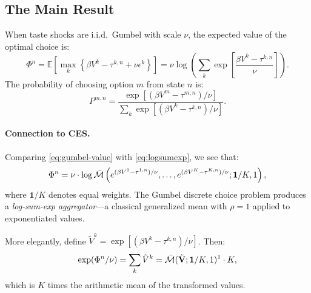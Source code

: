 \subsection{The Main Result}

\begin{theorem}
\label{thm:gumbel}
When taste shocks are i.i.d.\ Gumbel with scale $\nu$, the expected value of the optimal choice is:
\begin{equation}
\label{eq:gumbel-value}
\boxed{\Phi^n = \mathbb{E}\left[ \max_k \left\{ \beta V^k - \tau^{k,n} + \nu \epsilon^k \right\} \right] = \nu \log \left( \sum_k \exp\left[ \frac{\beta V^k - \tau^{k,n}}{\nu} \right] \right).}
\end{equation}
The probability of choosing option $m$ from state $n$ is:
\begin{equation}
\label{eq:gumbel-prob}
\boxed{P^{m,n} = \frac{\exp\left[ (\beta V^m - \tau^{m,n})/\nu \right]}{\sum_k \exp\left[ (\beta V^k - \tau^{k,n})/\nu \right]}.}
\end{equation}
\end{theorem}

\paragraph{Connection to CES.}

Comparing \eqref{eq:gumbel-value} with \eqref{eq:logsumexp}, we see that:
\begin{equation}
\Phi^n = \nu \cdot \log \bar{\mathcal{M}}\left( e^{(\beta V^1 - \tau^{1,n})/\nu}, \ldots, e^{(\beta V^K - \tau^{K,n})/\nu}; \mathbf{1}/K, 1 \right),
\end{equation}
where $\mathbf{1}/K$ denotes equal weights. The Gumbel discrete choice problem produces a \emph{log-sum-exp aggregator}---a classical generalized mean with $\rho = 1$ applied to exponentiated values.

More elegantly, define $\tilde{V}^k = \exp[(\beta V^k - \tau^{k,n})/\nu]$. Then:
\begin{equation}
\exp(\Phi^n / \nu) = \sum_k \tilde{V}^k = \bar{\mathcal{M}}(\tilde{\mathbf{V}}; \mathbf{1}/K, 1)^1 \cdot K,
\end{equation}
which is $K$ times the arithmetic mean of the transformed values.

